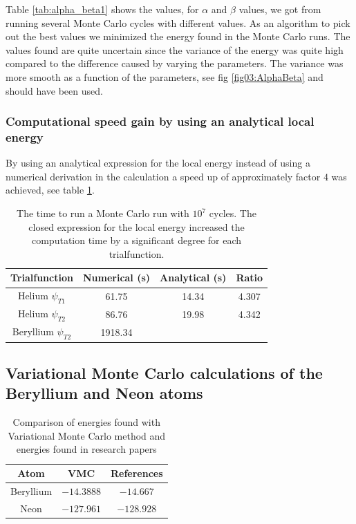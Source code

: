 \documentclass[x11names]{article}
\begin{document}
		Table \ref{tab:alpha_beta1} shows the values, for \(\alpha\) and \(\beta\) values, we got from  running several Monte Carlo cycles with different values. As an algorithm to pick out the best values we minimized the energy found in the Monte Carlo runs. The values found are quite uncertain since the variance of the energy was quite high compared to the difference caused by varying the parameters. The variance was more smooth as a function of the parameters, see fig \ref{fig03:AlphaBeta} and should have been used.




			\subsubsection{Computational speed gain by using an analytical local energy}
				By using an analytical expression for the local energy instead of using a numerical derivation in the calculation a speed up of approximately factor \(4\) was achieved, see table \ref{tab:analyticVSNumeric}.


				\begin{table}
					\center
					\begin{tabular}{| c | c | c | c |}
					    \hline
					   	\textbf{Trialfunction} & Numerical (s) & Analytical (s) & Ratio
					    \\ \hline
					    Helium $\psi_{T1}$ & 61.75 & 14.34 & 4.307
					    \\ \hline
					    Helium $\psi_{T2}$ & 86.76 & 19.98	& 4.342
					    \\	\hline
					    Beryllium $\psi_{T2}$ & 1918.34  &	 &
	 				    \\ \hline
					\end{tabular}
					\caption{The time to run a Monte Carlo run with \(10^7\) cycles. The closed expression for the local energy increased the computation time by a significant degree for each trialfunction. }
					\label{tab:analyticVSNumeric}
				\end{table}

	\subsection{Variational Monte Carlo calculations of the Beryllium and Neon atoms}

		\begin{table}
			\center
				\begin{tabular}{|c|c|c|}
				    \hline
				   	Atom & VMC & References
				    \\ \hline
				    Beryllium & $-14.3888$ & $-14.667$
				    \\ \hline
				    Neon & $-127.961$ &  \(-128.928\)
				    \\	\hline
			  \end{tabular}
			  \caption{Comparison of energies found with Variational Monte Carlo method and
			energies found in research papers \cite{Koput:2011:PCCP} \cite{QUA:QUA560090204} }
			\label{tab:energyReference}
		\end{table}
\end{document}
